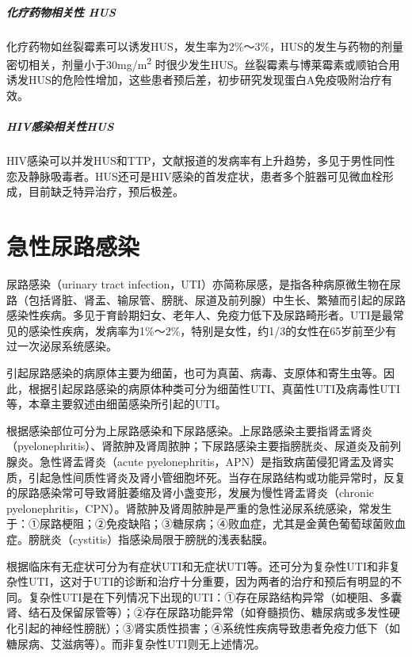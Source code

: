 \paragraph{化疗药物相关性 HUS}

化疗药物如丝裂霉素可以诱发HUS，发生率为2\%～3\%，HUS的发生与药物的剂量密切相关，剂量小于30mg/m\textsuperscript{2}
时很少发生HUS。丝裂霉素与博莱霉素或顺铂合用诱发HUS的危险性增加，这些患者预后差，初步研究发现蛋白A免疫吸附治疗有效。

\paragraph{HIV感染相关性HUS}

HIV感染可以并发HUS和TTP，文献报道的发病率有上升趋势，多见于男性同性恋及静脉吸毒者。HUS还可是HIV感染的首发症状，患者多个脏器可见微血栓形成，目前缺乏特异治疗，预后极差。

\protect\hypertarget{text00345.html}{}{}

\chapter{急性尿路感染}

尿路感染（urinary tract
infection，UTI）亦简称尿感，是指各种病原微生物在尿路（包括肾脏、肾盂、输尿管、膀胱、尿道及前列腺）中生长、繁殖而引起的尿路感染性疾病。多见于育龄期妇女、老年人、免疫力低下及尿路畸形者。UTI是最常见的感染性疾病，发病率为1\%～2\%，特别是女性，约1/3的女性在65岁前至少有过一次泌尿系统感染。

引起尿路感染的病原体主要为细菌，也可为真菌、病毒、支原体和寄生虫等。因此，根据引起尿路感染的病原体种类可分为细菌性UTI、真菌性UTI及病毒性UTI等，本章主要叙述由细菌感染所引起的UTI。

根据感染部位可分为上尿路感染和下尿路感染。上尿路感染主要指肾盂肾炎（pyelonephritis）、肾脓肿及肾周脓肿；下尿路感染主要指膀胱炎、尿道炎及前列腺炎。急性肾盂肾炎（acute
pyelonephritis，APN）是指致病菌侵犯肾盂及肾实质，引起急性间质性肾炎及肾小管细胞坏死。当存在尿路结构或功能异常时，反复的尿路感染常可导致肾脏萎缩及肾小盏变形，发展为慢性肾盂肾炎（chronic
pyelonephritis，CPN）。肾脓肿及肾周脓肿是严重的急性泌尿系统感染，常发生于：①尿路梗阻；②免疫缺陷；③糖尿病；④败血症，尤其是金黄色葡萄球菌败血症。膀胱炎（cystitis）指感染局限于膀胱的浅表黏膜。

根据临床有无症状可分为有症状UTI和无症状UTI等。还可分为复杂性UTI和非复杂性UTI，这对于UTI的诊断和治疗十分重要，因为两者的治疗和预后有明显的不同。复杂性UTI是在下列情况下出现的UTI：①存在尿路结构异常（如梗阻、多囊肾、结石及保留尿管等）；②存在尿路功能异常（如脊髓损伤、糖尿病或多发性硬化引起的神经性膀胱）；③肾实质性损害；④系统性疾病导致患者免疫力低下（如糖尿病、艾滋病等）。而非复杂性UTI则无上述情况。

